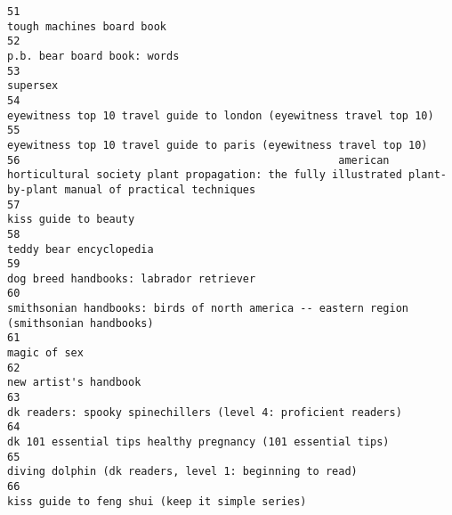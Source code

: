\documentclass[
]{report}
\begin{document}
\begin{verbatim}
51                                                                                                                                              tough machines board book
52                                                                                                                                            p.b. bear board book: words
53                                                                                                                                                               supersex
54                                                                                                    eyewitness top 10 travel guide to london (eyewitness travel top 10)
55                                                                                                     eyewitness top 10 travel guide to paris (eyewitness travel top 10)
56                                                  american horticultural society plant propagation: the fully illustrated plant-by-plant manual of practical techniques
57                                                                                                                                                   kiss guide to beauty
58                                                                                                                                                teddy bear encyclopedia
59                                                                                                                                dog breed handbooks: labrador retriever
60                                                                                smithsonian handbooks: birds of north america -- eastern region (smithsonian handbooks)
61                                                                                                                                                           magic of sex
62                                                                                                                                                  new artist's handbook
63                                                                                                         dk readers: spooky spinechillers (level 4: proficient readers)
64                                                                                                           dk 101 essential tips healthy pregnancy (101 essential tips)
65                                                                                                                diving dolphin (dk readers, level 1: beginning to read)
66                                                                                                                        kiss guide to feng shui (keep it simple series)

\end{verbatim}
\end{document}
